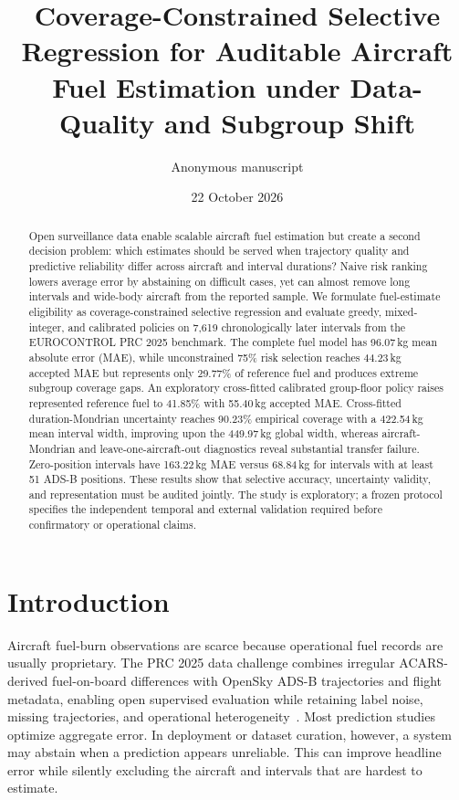 \documentclass[11pt]{article}
\title{Coverage-Constrained Selective Regression for Auditable Aircraft Fuel Estimation under Data-Quality and Subgroup Shift}
\author{Anonymous manuscript}
\date{22 October 2026}
\begin{document}
\maketitle

\begin{abstract}
Open surveillance data enable scalable aircraft fuel estimation but create a second decision problem: which estimates should be served when trajectory quality and predictive reliability differ across aircraft and interval durations? Naive risk ranking lowers average error by abstaining on difficult cases, yet can almost remove long intervals and wide-body aircraft from the reported sample. We formulate fuel-estimate eligibility as coverage-constrained selective regression and evaluate greedy, mixed-integer, and calibrated policies on 7,619 chronologically later intervals from the EUROCONTROL PRC 2025 benchmark. The complete fuel model has 96.07\,kg mean absolute error (MAE), while unconstrained 75\% risk selection reaches 44.23\,kg accepted MAE but represents only 29.77\% of reference fuel and produces extreme subgroup coverage gaps. An exploratory cross-fitted calibrated group-floor policy raises represented reference fuel to 41.85\% with 55.40\,kg accepted MAE. Cross-fitted duration-Mondrian uncertainty reaches 90.23\% empirical coverage with a 422.54\,kg mean interval width, improving upon the 449.97\,kg global width, whereas aircraft-Mondrian and leave-one-aircraft-out diagnostics reveal substantial transfer failure. Zero-position intervals have 163.22\,kg MAE versus 68.84\,kg for intervals with at least 51 ADS-B positions. These results show that selective accuracy, uncertainty validity, and representation must be audited jointly. The study is exploratory; a frozen protocol specifies the independent temporal and external validation required before confirmatory or operational claims.
\end{abstract}

\section{Introduction}
Aircraft fuel-burn observations are scarce because operational fuel records are usually proprietary. The PRC 2025 data challenge combines irregular ACARS-derived fuel-on-board differences with OpenSky ADS-B trajectories and flight metadata, enabling open supervised evaluation while retaining label noise, missing trajectories, and operational heterogeneity~\cite{sun2026}. Most prediction studies optimize aggregate error. In deployment or dataset curation, however, a system may abstain when a prediction appears unreliable. This can improve headline error while silently excluding the aircraft and intervals that are hardest to estimate.
\end{document}
